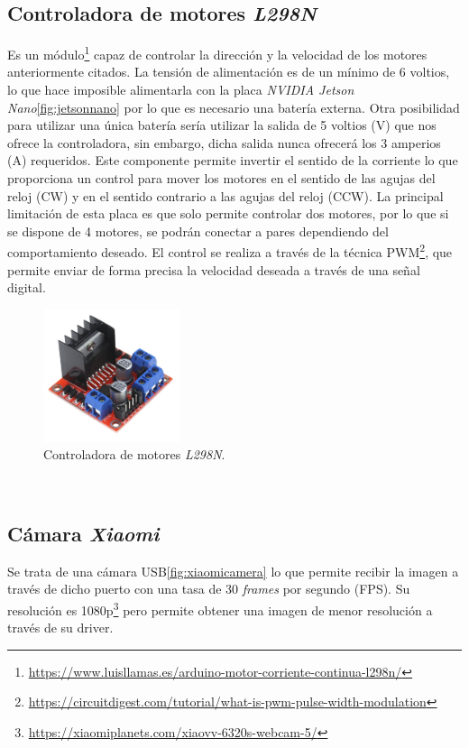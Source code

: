 \subsection{Controladora de motores \textit{L298N}}
Es un módulo\footnote{\url{https://www.luisllamas.es/arduino-motor-corriente-continua-l298n/}} capaz de controlar la dirección y la velocidad de los motores anteriormente citados. La tensión de alimentación es de un mínimo de 6 voltios, lo que hace imposible alimentarla con la placa \textit{NVIDIA Jetson Nano}\ref{fig:jetsonnano} por lo que es necesario una batería externa. Otra posibilidad para utilizar una única batería sería utilizar la salida de 5 voltios (V) que nos ofrece la controladora, sin embargo, dicha salida nunca ofrecerá los 3 amperios (A) requeridos. Este componente permite invertir el sentido de la corriente lo que proporciona un control para mover los motores en el sentido de las agujas del reloj (CW) y en el sentido contrario a las agujas del reloj (CCW). La principal limitación de esta placa es que solo permite controlar dos motores, por lo que si se dispone de 4 motores, se podrán conectar a pares dependiendo del comportamiento deseado. El control se realiza a través de la técnica PWM\footnote{\url{https://circuitdigest.com/tutorial/what-is-pwm-pulse-width-modulation}}, que permite enviar de forma precisa la velocidad deseada a través de una señal digital.\\

\begin{figure} [h!]
	\begin{center}
		\includegraphics[width=4cm]{figs/l298n}
	\end{center}
	\caption{Controladora de motores \textit{L298N}.}
	\label{fig:l298n}
\end{figure}\

\subsection{Cámara \textit{Xiaomi}}
Se trata de una cámara USB\ref{fig:xiaomicamera} lo que permite recibir la imagen a través de dicho puerto con una tasa de 30 \textit{frames} por segundo (FPS). Su resolución es 1080p\footnote{\url{https://xiaomiplanets.com/xiaovv-6320s-webcam-5/}} pero permite obtener una imagen de menor resolución a través de su driver.\\


